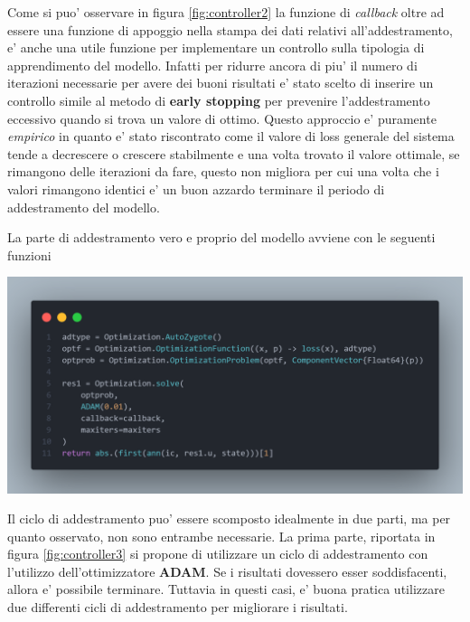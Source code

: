 Come si puo' osservare in figura \ref{fig:controller2} la funzione di \emph{callback} oltre ad essere una funzione di 
appoggio nella stampa dei dati relativi all'addestramento, e' anche una utile funzione per implementare un controllo sulla tipologia 
di apprendimento del modello. Infatti per ridurre ancora di piu' il numero di iterazioni necessarie per avere dei buoni risultati 
e' stato scelto di inserire un controllo simile al metodo di \textbf{early stopping} \cite{wiki:Early_stopping} per prevenire 
l'addestramento eccessivo quando si trova un valore di ottimo. Questo approccio e' puramente \emph{empirico} in quanto 
e' stato riscontrato come il valore di loss generale del sistema tende a decrescere o crescere stabilmente e una volta trovato il 
valore ottimale, se rimangono delle iterazioni da fare, questo non migliora per cui una volta che i valori rimangono identici 
e' un buon azzardo terminare il periodo di addestramento del modello.

La parte di addestramento vero e proprio del modello avviene con le seguenti funzioni

\begin{minipage}{\linewidth}
	\centering
	\includegraphics[width=\textwidth]{img/controller3.png}
	\label{fig:controller3}
\end{minipage}

Il ciclo di addestramento puo' essere scomposto idealmente in due parti, ma per quanto osservato, non sono 
entrambe necessarie. La prima parte, riportata in figura \ref{fig:controller3} si propone di utilizzare un ciclo di addestramento 
con l'utilizzo dell'ottimizzatore \textbf{ADAM}. Se i risultati dovessero esser soddisfacenti, allora e' possibile terminare. 
Tuttavia in questi casi, e' buona pratica utilizzare due differenti cicli di addestramento per migliorare i risultati. 

